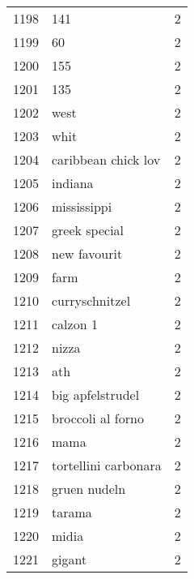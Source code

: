 \begin{tabular}{llr}
1198 &                                                141 &      2 \\
1199 &                                                 60 &      2 \\
1200 &                                                155 &      2 \\
1201 &                                                135 &      2 \\
1202 &                                               west &      2 \\
1203 &                                               whit &      2 \\
1204 &                                caribbean chick lov &      2 \\
1205 &                                            indiana &      2 \\
1206 &                                        mississippi &      2 \\
1207 &                                      greek special &      2 \\
1208 &                                       new favourit &      2 \\
1209 &                                               farm &      2 \\
1210 &                                     curryschnitzel &      2 \\
1211 &                                           calzon 1 &      2 \\
1212 &                                              nizza &      2 \\
1213 &                                                ath &      2 \\
1214 &                                   big apfelstrudel &      2 \\
1215 &                                  broccoli al forno &      2 \\
1216 &                                               mama &      2 \\
1217 &                               tortellini carbonara &      2 \\
1218 &                                       gruen nudeln &      2 \\
1219 &                                             tarama &      2 \\
1220 &                                              midia &      2 \\
1221 &                                             gigant &      2 \\

\end{tabular}
